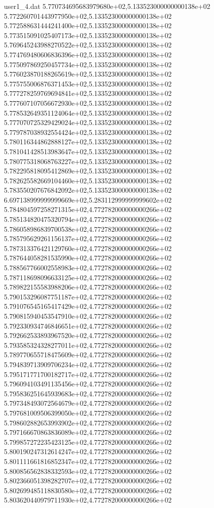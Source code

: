 \begin{filecontents}{user1_4.dat}
5.770734695683979680e+02,5.133523000000000138e+02
5.772260701443977950e+02,5.133523000000000138e+02
5.772588631444241400e+02,5.133523000000000138e+02
5.773515091025407173e+02,5.133523000000000138e+02
5.769645243988270522e+02,5.133523000000000138e+02
5.774769480606836396e+02,5.133523000000000138e+02
5.775097869250457734e+02,5.133523000000000138e+02
5.776023870188265619e+02,5.133523000000000138e+02
5.775755006876371453e+02,5.133523000000000138e+02
5.777278259769694841e+02,5.133523000000000138e+02
5.777607107056672930e+02,5.133523000000000138e+02
5.778532649351124064e+02,5.133523000000000138e+02
5.777070725329429024e+02,5.133523000000000138e+02
5.779787038932554424e+02,5.133523000000000138e+02
5.780116344862888127e+02,5.133523000000000138e+02
5.781041428513983647e+02,5.133523000000000138e+02
5.780775318068763227e+02,5.133523000000000138e+02
5.782295818095412869e+02,5.133523000000000138e+02
5.782625582669104460e+02,5.133523000000000138e+02
5.783550207676842092e+02,5.133523000000000138e+02
6.697138999999999669e+02,5.283112999999999602e+02
5.784804597258271315e+02,4.772782000000000266e+02
5.785134820475320794e+02,4.772782000000000266e+02
5.786058986839700538e+02,4.772782000000000266e+02
5.785795629261156137e+02,4.772782000000000266e+02
5.787313376421129760e+02,4.772782000000000266e+02
5.787644058281535990e+02,4.772782000000000266e+02
5.788567766002558983e+02,4.772782000000000266e+02
5.787118698096633125e+02,4.772782000000000266e+02
5.789822155583988206e+02,4.772782000000000266e+02
5.790153296087751187e+02,4.772782000000000266e+02
5.791076545165417429e+02,4.772782000000000266e+02
5.790815940453547910e+02,4.772782000000000266e+02
5.792330934746846651e+02,4.772782000000000266e+02
5.792662533893967520e+02,4.772782000000000266e+02
5.793585324328277011e+02,4.772782000000000266e+02
5.789770655718475609e+02,4.772782000000000266e+02
5.794839713909706234e+02,4.772782000000000266e+02
5.795171771700182717e+02,4.772782000000000266e+02
5.796094103491135456e+02,4.772782000000000266e+02
5.795836251645939683e+02,4.772782000000000266e+02
5.797348493072564679e+02,4.772782000000000266e+02
5.797681009506399050e+02,4.772782000000000266e+02
5.798602882653993902e+02,4.772782000000000266e+02
5.797166670863836089e+02,4.772782000000000266e+02
5.799857272235423125e+02,4.772782000000000266e+02
5.800190247312614247e+02,4.772782000000000266e+02
5.801111661816852347e+02,4.772782000000000266e+02
5.800856562838332593e+02,4.772782000000000266e+02
5.802366051398282707e+02,4.772782000000000266e+02
5.802699485118830580e+02,4.772782000000000266e+02
5.803620440979711930e+02,4.772782000000000266e+02

\end{filecontents}
